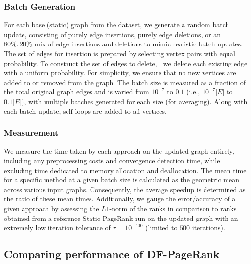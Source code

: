 


\subsubsection{Batch Generation}
\label{sec:batch-generation}

For each base (static) graph from the dataset, we generate a random batch update, consisting of purely edge insertions, purely edge deletions, or an $80\% : 20\%$ mix of edge insertions and deletions to mimic realistic batch updates. The set of edges for insertion is prepared by selecting vertex pairs with equal probability. To construct the set of edges to delete, , we delete each existing edge with a uniform probability. For simplicity, we ensure that no new vertices are added to or removed from the graph. The batch size is measured as a fraction of the total original graph edges and is varied from $10^{-7}$ to $0.1$ (i.e., $10^{-7}|E|$ to $0.1|E|$), with multiple batches generated for each size (for averaging). Along with each batch update, self-loops are added to all vertices.


\subsubsection{Measurement}
\label{sec:measurement}

We measure the time taken by each approach on the updated graph entirely, including any preprocessing costs and convergence detection time, while excluding time dedicated to memory allocation and deallocation. The mean time for a specific method at a given batch size is calculated as the geometric mean across various input graphs. Consequently, the average speedup is determined as the ratio of these mean times. Additionally, we gauge the error/accuracy of a given approach by assessing the $L1$-norm of the ranks in comparison to ranks obtained from a reference Static PageRank run on the updated graph with an extremely low iteration tolerance of $\tau = 10^{-100}$ (limited to $500$ iterations).




\subsection{Comparing performance of DF-PageRank}

